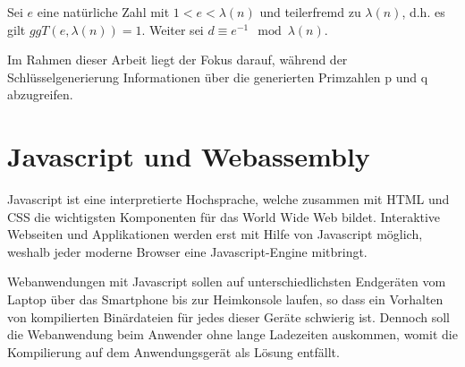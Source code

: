 Sei $e$ eine natürliche Zahl mit $1<e<\lambda(n)$ und teilerfremd zu $\lambda(n)$, d.h. es gilt $ggT(e,\lambda(n)) = 1$. Weiter sei $d \equiv e^{-1} \mod \lambda(n)$.

Im Rahmen dieser Arbeit liegt der Fokus darauf, während der Schlüsselgenerierung Informationen über die generierten Primzahlen p und q abzugreifen.











\section{Javascript und Webassembly}

Javascript ist eine interpretierte Hochsprache, welche zusammen mit HTML und CSS die wichtigsten Komponenten für das World Wide Web bildet. 
Interaktive Webseiten und Applikationen werden erst mit Hilfe von Javascript möglich, weshalb jeder moderne Browser eine Javascript-Engine mitbringt.

Webanwendungen mit Javascript sollen auf unterschiedlichsten Endgeräten vom Laptop über das Smartphone bis zur Heimkonsole laufen, so dass ein Vorhalten von kompilierten Binärdateien für jedes dieser Geräte schwierig ist. 
Dennoch soll die Webanwendung beim Anwender ohne lange Ladezeiten auskommen, womit die Kompilierung auf dem Anwendungsgerät als Lösung entfällt.

